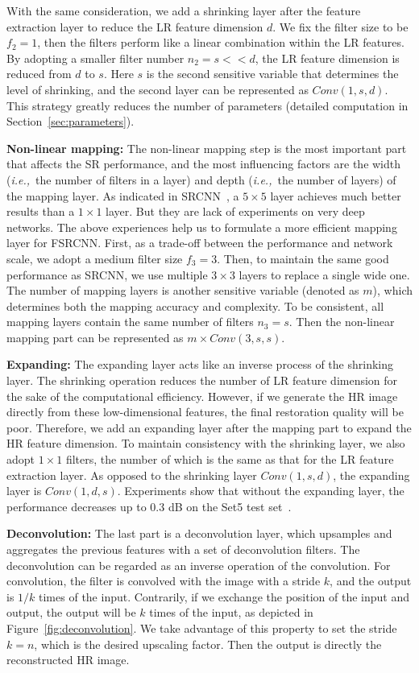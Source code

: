 \documentclass[runningheads]{llncs}
\newcommand{\ie}{\emph{i.e.,}}
\begin{document}
With the same consideration, we add a shrinking layer after the feature extraction layer to reduce the LR feature dimension $d$. We fix the filter size to be $f_2=1$, then the filters perform like a linear combination within the LR features. By adopting a smaller filter number $n_2=s<<d$, the LR feature dimension is reduced from $d$ to $s$. Here $s$ is the second sensitive variable that determines the level of shrinking, and the second layer can be represented as $Conv(1,s,d)$.
This strategy greatly reduces the number of parameters (detailed computation in Section~\ref{sec:parameters}).

\noindent
\textbf{Non-linear mapping:} The non-linear mapping step is the most important part that affects the SR performance, and the most influencing factors are the width (\ie~the number of filters in a layer) and depth (\ie~the number of layers) of the mapping layer. As indicated in SRCNN~\cite{Dong2015}, a $5\times 5$ layer achieves much better results than a $1\times 1$ layer. But they are lack of experiments on very deep networks.
The above experiences help us to formulate a more efficient mapping layer for FSRCNN. First, as a trade-off between the performance and network scale, we adopt a medium filter size $f_3=3$. Then, to maintain the same good performance as SRCNN, we use multiple $3\times 3$ layers to replace a single wide one. The number of mapping layers is another sensitive variable (denoted as $m$), which determines both the mapping accuracy and complexity. To be consistent, all mapping layers contain the same number of filters $n_3=s$. Then the non-linear mapping part can be represented as $m\times Conv(3, s, s)$.


\noindent
\textbf{Expanding:} The expanding layer acts like an inverse process of the shrinking layer. The shrinking operation reduces the number of LR feature dimension for the sake of the computational efficiency. However, if we generate the HR image directly from these low-dimensional features, the final restoration quality will be poor. Therefore, we add an expanding layer after the mapping part to expand the HR feature dimension. To maintain consistency with the shrinking layer, we also adopt $1\times 1$ filters, the number of which is the same as that for the LR feature extraction layer. As opposed to the shrinking layer $Conv(1,s,d)$, the expanding layer is $Conv(1,d,s)$. Experiments show that without the expanding layer, the performance decreases up to 0.3 dB on the Set5 test set~\cite{Bevilacqua2012}.

\noindent
\textbf{Deconvolution:} The last part is a deconvolution layer, which upsamples and aggregates the previous features with a set of deconvolution filters. The deconvolution can be regarded as an inverse operation of the convolution. For convolution, the filter is convolved with the image with a stride $k$, and the output is $1/k$ times of the input. Contrarily, if we exchange the position of the input and output, the output will be $k$ times of the input, as depicted in Figure~\ref{fig:deconvolution}. We take advantage of this property to set the stride $k=n$, which is the desired upscaling factor. Then the output is directly the reconstructed HR image.
\end{document}
